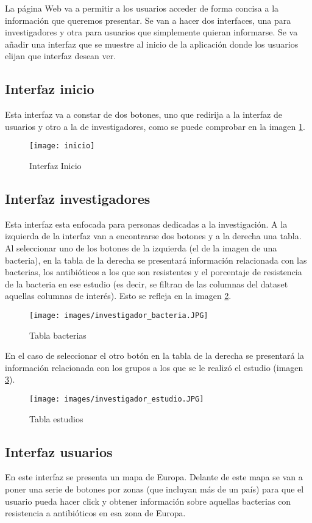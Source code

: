 \documentclass[../main.tex]{subfiles}
\begin{document}
La página Web va a permitir a los usuarios acceder de forma concisa a la información que queremos presentar. Se van a hacer dos interfaces, una para investigadores y otra para usuarios que simplemente quieran informarse. Se va añadir una interfaz que se muestre al inicio de la aplicación donde los usuarios elijan que interfaz desean ver.

\subsection{Interfaz inicio}

Esta interfaz va a constar de dos botones, uno que redirija a la interfaz de usuarios y otro a la de investigadores, como se puede comprobar en la imagen \ref{inc}.

\begin{figure}[ht]
    \centering
    \texttt{[image: inicio]}
    \caption{Interfaz Inicio}
    \label{inc}
\end{figure}

\subsection{Interfaz investigadores}

Esta interfaz esta enfocada para personas dedicadas a la investigación. A la izquierda de la interfaz van a encontrarse dos botones y a la derecha una tabla. Al seleccionar uno de los botones de la izquierda (el de la imagen de una bacteria), en la tabla de la derecha se presentará información relacionada con las bacterias, los antibióticos a los que son resistentes y el porcentaje de resistencia de la bacteria en ese estudio (es decir, se filtran de las columnas del dataset aquellas columnas de interés). Esto se refleja en la imagen \ref{invBac}.

\begin{figure}[ht]
    \centering
    \texttt{[image: images/investigador\_bacteria.JPG]}
    \caption{Tabla bacterias}
    \label{invBac}
\end{figure}


En el caso de seleccionar el otro botón en la tabla de la derecha se presentará la información relacionada con los grupos a los que se le realizó el estudio (imagen  \ref{invEst}).

\begin{figure}[ht]
    \centering
    \texttt{[image: images/investigador\_estudio.JPG]}
    \caption{Tabla estudios}
    \label{invEst}
\end{figure}

\subsection{Interfaz usuarios}

En este interfaz se presenta un mapa de Europa. Delante de este mapa se van a poner una serie de botones por zonas (que incluyan más de un país) para que el usuario pueda hacer click y obtener información sobre aquellas bacterias con resistencia a antibióticos en esa zona de Europa.
\end{document}
